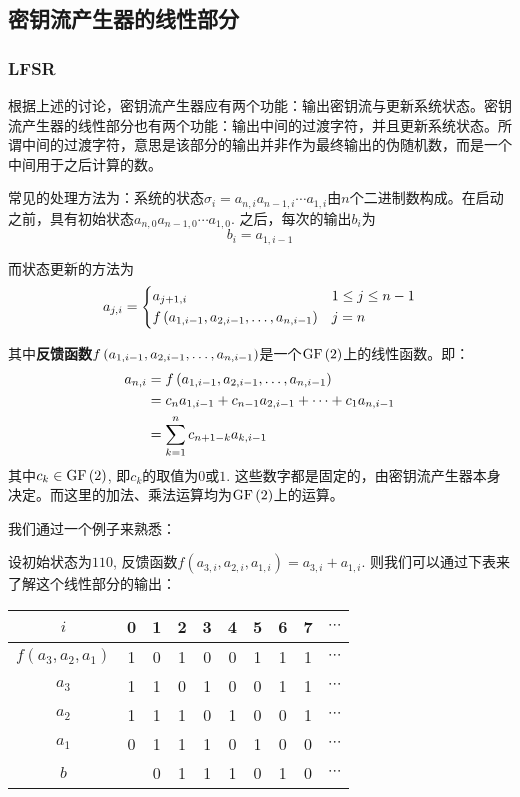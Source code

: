 \subsection{密钥流产生器的线性部分}
\subsubsection{LFSR}
根据上述的讨论，密钥流产生器应有两个功能：输出密钥流与更新系统状态。密钥流产生器的线性部分也有两个功能：输出中间的过渡字符，并且更新系统状态。所谓中间的过渡字符，意思是该部分的输出并非作为最终输出的伪随机数，而是一个中间用于之后计算的数。\par
常见的处理方法为：系统的状态$\sigma_i=a_{n, i}a_{n-1, i}\cdots a_{1, i}$由$n$个二进制数构成。在启动之前，具有初始状态$a_{n, 0}a_{n-1, 0}\cdots a_{1, 0}$. 之后，每次的输出$b_i$为
\begin{equation}
    b_i=a_{1, i-1}
\end{equation}

而状态更新的方法为
\begin{equation}
    a_{j, i}=\begin{dcases}a_{j+1, i}&1\leq j\leq n-1\\f\left( {a_{1, i-1}, a_{2, i-1}, \ldots, a_{n, i-1}}\right)&j=n\end{dcases}
\end{equation}

其中\textbf{反馈函数}$f\left( {a_{1, i-1}, a_{2, i-1}, \ldots, a_{n, i-1}}\right)$是一个$\mathrm{GF}\left( {2}\right)$上的线性函数。即：
\begin{align}
    a_{n, i}&=f\left( {a_{1, i-1}, a_{2, i-1}, \ldots, a_{n, i-1}}\right)\notag\\
    &=c_na_{1, i-1}+c_{n-1}a_{2, i-1}+\cdots +c_1a_{n, i-1}\\
    &=\sum_{k=1}^nc_{n+1-k}a_{k, i-1}
\end{align}
其中$c_k\in\mathrm{GF}\left( {2}\right)$, 即$c_k$的取值为$0$或$1$. 这些数字都是固定的，由密钥流产生器本身决定。而这里的加法、乘法运算均为$\mathrm{GF}\left( {2}\right)$上的运算。\par
我们通过一个例子来熟悉：\par
设初始状态为$110$, 反馈函数$f(a_{3, i}, a_{2, i}, a_{1, i})=a_{3, i}+a_{1, i}$. 则我们可以通过下表来了解这个线性部分的输出：
\begin{table}[H]
    \centering
    \begin{tabular}{c|c|c|c|c|c|c|c|c|c}\hline
        $i$&0&1&2&3&4&5&6&7&$\cdots$\\\hline
        $f(a_3, a_2, a_1)$&1&0&1&0&0&1&1&1&$\cdots$\\\hline
        $a_3$&1&1&0&1&0&0&1&1&$\cdots$\\\hline
        $a_2$&1&1&1&0&1&0&0&1&$\cdots$\\\hline
        $a_1$&0&1&1&1&0&1&0&0&$\cdots$\\\hline
        $b$&&0&1&1&1&0&1&0&$\cdots$\\\hline
    \end{tabular}
\end{table}

